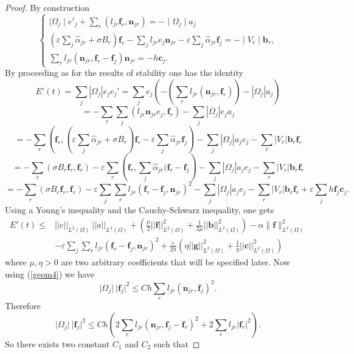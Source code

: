 \documentclass[a4paper,french,english,10pt]{article}
\newcommand\ljr{l_{jr}}
\newcommand\njr{\mathbf{n}_{jr}}
\newcommand\eps{\varepsilon}
\newcommand\alj{\widehat{\alpha}_{jr}}
\newcommand\fj{\mathbf{f}_j}
\newcommand\fr{\mathbf{f}_r}
\newcommand\cc{\mathbf{c}}
\newcommand\bb{\mathbf{b}}
\newcommand\cj{\cc_j}
\newcommand\br{\bb_r}
\newcommand\ff{\mathbf{f}}
\newcommand\gf{\mathbf{g}}
\begin{document}
\begin{proof}
By construction
\begin{equation*}\label{eq:d30}
\left\{ 
\begin{array}{l}
\displaystyle \mid\Omega_{j}\mid e'_{j}+
\sum_{r}(l_{jr}\fr,\njr)=-\mid\Omega_{j}\mid a_j\\
 \left( \eps\sum_{j}\alj+  \sigma B_r\right)\fr-
\sum_{j}\ljr e_j\njr-\eps\sum_j\alj\fj=-\mid
V_r\mid\br , \\
 \sum_{r}l_{jr} (\njr,\fr -\fj)\njr=-h\cj.
\end{array}
\right.
\end{equation*}
By proceeding as for the results of stability one has the identity
$$
E'(t)= \sum_j |\Omega_j| e_j e_j'=
\sum_j  e_j\left(
- \left( \sum_r l_{jr}\left(\njr, \fr  
   \right)\right)
- \left| \Omega_j \right| a_j 
\right)
$$ 
$$
=- \sum_r \sum_j (  l_{jr}  \mathbf n_{jr} e_j , \mathbf f_r)
- \sum_j\left| \Omega_j \right| e_j a_j 
$$
$$= -\sum_r \left (\fr, \left( \eps\sum_{j}\alj+  \sigma
B_r\right)\fr- \eps\sum_j\alj\fj\right )
- \sum_j \left| \Omega_j \right| a_j e_j
- \sum_r \left| V_r \right| \br \fr
$$
$$= -\sum_r \left (\sigma B_r \fr, \fr\right ) 
-\eps \sum_r\left( \fr, \sum_j \alj(\fr -\fj\right )
- \sum_j \left| \Omega_j \right| a_j e_j
- \sum_r \left| V_r \right| \br \fr
$$
$$= -\sum_r \left (\sigma B_r \fr, \fr\right ) 
-\eps\sum_j\sum_r \ljr \left( \fr- \fj,  \njr\right )^2
- \sum_j \left| \Omega_j \right| a_j e_j
- \sum_r \left| V_r \right| \br \fr +\eps\sum_j h \fj\cj.
$$
Using a Young's inequality and the Cauchy-Schwarz inequality, one gets
\begin{equation} \label{eq:yi}
\begin{aligned}
E'(t) \leq & ||e||_{L^2(\Omega)}\ ||a||_{L^2(\Omega)} +
\left(
\frac{\mu}{2} ||\ff ||^2_{L^2(\Omega)} + \frac{1}{2\mu} ||\bb||^2_{L^2(\Omega)} 
\right)
-  \alpha \|  \ff \|^2_{L^2(\Omega)}\\
&
  -\eps\sum_j\sum_r \ljr \left( \fr- \fj,  \njr\right )^2 
+\frac{\eps}{2h}\left (\eta||\gf ||^2_{L^2(\Omega)}
+\frac{1}{\eta}||\cc||^2_{L^2(\Omega)} \right )
\end{aligned}
\end{equation}
where $ \mu,\eta >0$ are two arbitrary coefficients that will be 
specified later. 
Now using  (\ref{geom4})
we have
$$
\vert \Omega_j\vert \ \vert \fj \vert^2\leq C h\sum_r\ljr(\njr,\fj)^2.
$$
Therefore
$$
\vert \Omega_j\vert \ \vert\fj \vert^2\leq 
Ch \left(2\sum_r\ljr(\njr,\fj-\fr)^2+2\sum_r \ljr \vert 
\fr \vert^2\right ).
$$
So 
there exists two constant $C_1$ and $C_2$ such that

\end{proof}
\end{document}
